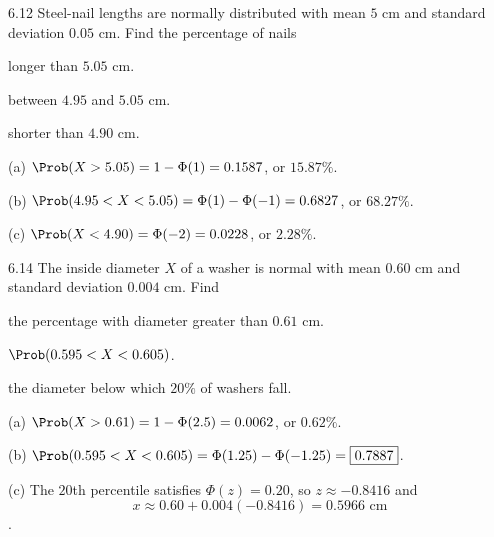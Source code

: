 \documentclass[11pt,oneside]{article}
\begin{document}
\begin{exercise}{6.12}
Steel-nail lengths are normally distributed with mean $5$ cm and standard deviation $0.05$ cm. Find the percentage of nails
\begin{exercisesubparts}
\item longer than $5.05$ cm.
\item between $4.95$ and $5.05$ cm.
\item shorter than $4.90$ cm.
\end{exercisesubparts}
\end{exercise}

\begin{solution}
\noindent\textup{(a)} $\Prob(X>5.05)=1-\Phi(1)=0.1587$, or $\boxed{15.87\%}$.

\noindent\textup{(b)} $\Prob(4.95<X<5.05)=\Phi(1)-\Phi(-1)=0.6827$, or $\boxed{68.27\%}$.

\noindent\textup{(c)} $\Prob(X<4.90)=\Phi(-2)=0.0228$, or $\boxed{2.28\%}$.
\end{solution}

\begin{exercise}{6.14}
The inside diameter $X$ of a washer is normal with mean $0.60$ cm and standard deviation $0.004$ cm. Find
\begin{exercisesubparts}
\item the percentage with diameter greater than $0.61$ cm.
\item $\Prob(0.595<X<0.605)$.
\item the diameter below which $20\%$ of washers fall.
\end{exercisesubparts}
\end{exercise}

\begin{solution}
\noindent\textup{(a)} $\Prob(X>0.61)=1-\Phi(2.5)=0.0062$, or $\boxed{0.62\%}$.

\noindent\textup{(b)} $\Prob(0.595<X<0.605)=\Phi(1.25)-\Phi(-1.25)=\boxed{0.7887}$.

\noindent\textup{(c)} The $20$th percentile satisfies $\Phi(z)=0.20$, so $z\approx-0.8416$ and \[\boxed{x\approx0.60+0.004(-0.8416)=0.5966\text{ cm}}\].
\end{solution}
\end{document}
